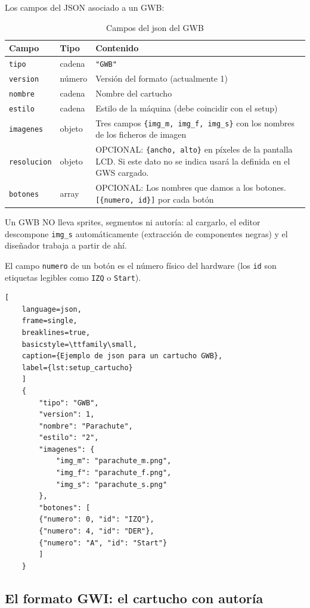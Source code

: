 Los campos del JSON asociado a un GWB:

\begin{table}[H]
	\centering
	\begin{tabular}{llp{10cm}}
		\toprule
		Campo & Tipo & Contenido \\
		\midrule
		\texttt{tipo} & cadena & \texttt{"GWB"} \\
		\texttt{version} & número & Versión del formato (actualmente 1) \\
		\texttt{nombre} & cadena & Nombre del cartucho \\
		\texttt{estilo} & cadena & Estilo de la máquina (debe coincidir con el setup) \\
		\texttt{imagenes} & objeto & Tres campos \texttt{\{img\_m, img\_f, img\_s\}} con los  nombres de los ficheros de imagen \\
		\texttt{resolucion} & objeto & OPCIONAL: \texttt{\{ancho, alto\}} en píxeles de la pantalla LCD. Si este dato no se indica usará la definida en el GWS cargado. \\
		\texttt{botones} & array & OPCIONAL: Los nombres que damos a los botones. \texttt{[\{numero, id\}]} por cada botón \\
		\bottomrule
	\end{tabular}
	\caption{Campos del json del GWB}
	\label{tab:F1A01GWB}
\end{table}

Un GWB NO lleva sprites, segmentos ni autoría: al cargarlo, el editor
descompone \texttt{img\_s} automáticamente (extracción de componentes
negras) y el diseñador trabaja a partir de ahí. 

El campo \texttt{numero} de un botón es el número físico del hardware (los
\texttt{id} son etiquetas legibles como \texttt{IZQ} o \texttt{Start}).

\begin{lstlisting}[
	language=json, 
	frame=single, 
	breaklines=true, 
	basicstyle=\ttfamily\small,
	caption={Ejemplo de json para un cartucho GWB},
	label={lst:setup_cartucho}
	]
	{
		"tipo": "GWB",
		"version": 1,
		"nombre": "Parachute",
		"estilo": "2",
		"imagenes": {
			"img_m": "parachute_m.png",
			"img_f": "parachute_f.png",
			"img_s": "parachute_s.png"
		},
		"botones": [
		{"numero": 0, "id": "IZQ"},
		{"numero": 4, "id": "DER"},
		{"numero": "A", "id": "Start"}
		]
	}
\end{lstlisting}

\subsection*{El formato GWI: el cartucho con autoría}
\label{sec:F1A01GWI}

